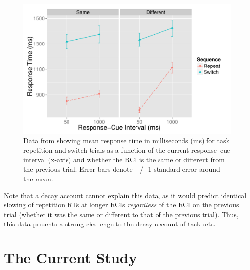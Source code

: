 \documentclass[a4paper, man, natbib]{apa6}
\begin{document}
\begin{figure}
\begin{center}
\includegraphics[width = \textwidth]{Images/grangeData.pdf}
\caption{Data from \cite{Grangeinrevision} showing mean response time in milliseconds (ms) for task repetition and switch trials as a function of the current response--cue interval (x-axis) and whether the RCI is the same or different from the previous trial. Error bars denote  +/- 1 standard error around the mean.}
\label{fig:grangeData}
\end{center}
\end{figure}

Note that a decay account cannot explain this data, as it would predict identical slowing of repetition RTs at longer RCIs \emph{regardless} of the RCI on the previous trial (whether it was the same or different to that of the previous trial). Thus, this data presents a strong challenge to the decay account of task-sets.


\section{The Current Study}
\end{document}
